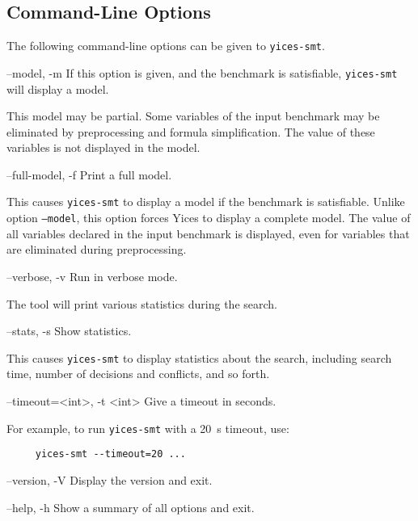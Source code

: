 \documentclass[11pt,twoside,fleqn,openright,titlepage]{cslreport}
\newenvironment{options}{
\begin{list}{}{
\setlength{\labelsep}{1.8ex}
\setlength{\labelwidth}{0pt}
\setlength{\itemindent}{-0.5\leftmargin}
\settowidth{\leftmargin}{\texttt{--}}
\renewcommand{\makelabel}{\optionlabel}}}
{\end{list}}
\newcommand*\optionlabel[1]{\hspace\labelsep\texttt{#1}}
\begin{document}
\subsection{Command-Line Options}

The following command-line options can be given to \texttt{yices-smt}.
\begin{options}
\item[--model, -m] If this option is given, and the benchmark
  is satisfiable, \texttt{yices-smt} will display a model.

  This model may be partial. Some variables of the input benchmark may
  be eliminated by preprocessing and formula simplification. The value
  of these variables is not displayed in the model.

\item[--full-model, -f] Print a full model.

  This causes \texttt{yices-smt} to display a model if the benchmark
  is satisfiable. Unlike option \texttt{--model}, this option forces
  Yices to display a complete model. The value of all variables
  declared in the input benchmark is displayed, even for variables
  that are eliminated during preprocessing.

\item[--verbose, -v] Run in verbose mode.

  The tool will print various statistics during the search.

\item[--stats, -s] Show statistics.

  This causes \texttt{yices-smt} to display statistics about the
  search, including search time, number of decisions and conflicts,
  and so forth.

\item[--timeout=<int>, -t <int>] Give a timeout in seconds.

  For example, to run \texttt{yices-smt} with a 20~s timeout, use:
  \begin{small}
  \vspace*{-2mm}
  \begin{verbatim}
     yices-smt --timeout=20 ...
  \end{verbatim}
  \vspace*{-7mm}
  \end{small}
\item[--version, -V] Display the version and exit.

\item[--help, -h] Show a summary of all options and exit.
\end{options}
\end{document}
